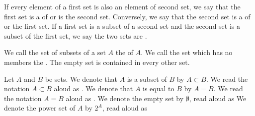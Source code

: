 
If every element of a first set is also an element of second set, we say that the first set is a  of or is  the second set.
Conversely, we say that the second set is a  of or  the first set.
If a first set is a subset of a second set and the second set is a subset of the first set, we say the two sets are .

We call the set of subsets of a set $A$ the  of $A$.
We call the set which has no members the .
The empty set is contained in every other set.

Let $A$ and $B$ be sets.
We denote that $A$ is a subset of $B$ by $A \subset B$.
We read the notation $A \subset B$ aloud as .
We denote that $A$ is equal to $B$ by $A = B$.
We read the notation $A = B$ aloud as .
We denote the empty set by $\emptyset$, read aloud as 
We denote the power set of $A$ by $2^{A}$, read aloud as 

\strats

